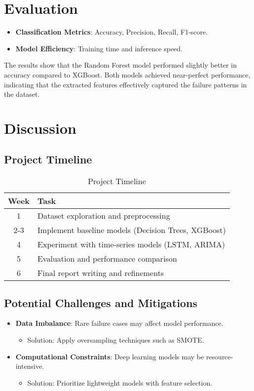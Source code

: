 \documentclass[sigconf]{acmart}
\begin{document}
\section{Evaluation}
\begin{itemize}
    \item \textbf{Classification Metrics}: Accuracy, Precision, Recall, F1-score.
    \item \textbf{Model Efficiency}: Training time and inference speed.
\end{itemize}

The results show that the Random Forest model performed slightly better in accuracy compared to XGBoost. Both models achieved near-perfect performance, indicating that the extracted features effectively captured the failure patterns in the dataset.

\section{Discussion}
\subsection{Project Timeline}
\begin{table}[h]
    \centering
    \begin{tabular}{|c|l|}
    \hline
    Week & Task \\
    \hline
    1 & Dataset exploration and preprocessing \\
    2-3 & Implement baseline models (Decision Trees, XGBoost) \\
    4 & Experiment with time-series models (LSTM, ARIMA) \\
    5 & Evaluation and performance comparison \\
    6 & Final report writing and refinements \\
    \hline
    \end{tabular}
    \caption{Project Timeline}
\end{table}

\subsection{Potential Challenges and Mitigations}
\begin{itemize}
    \item \textbf{Data Imbalance}: Rare failure cases may affect model performance.
    \begin{itemize}
        \item Solution: Apply oversampling techniques such as SMOTE.
    \end{itemize}
    \item \textbf{Computational Constraints}: Deep learning models may be resource-intensive.
    \begin{itemize}
        \item Solution: Prioritize lightweight models with feature selection.
    \end{itemize}
\end{itemize}
\end{document}
